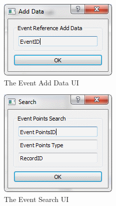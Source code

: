 \begin{figure}
\includegraphics[width=\textwidth]{./Maintenance/UI/EventAD.png}
\caption{The Event Add Data UI} \label{fig:EventAD_UI}
\end{figure}

\begin{figure}
\includegraphics[width=\textwidth]{./Maintenance/UI/EventSearch.png}
\caption{The Event Search UI} \label{fig:EventSearch_UI}
\end{figure}

